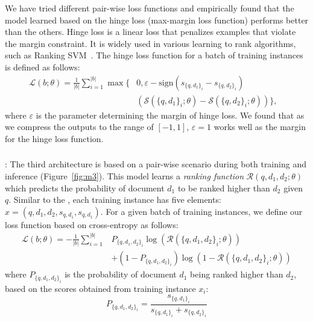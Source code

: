 We have tried different pair-wise loss functions and empirically found that the model learned based on the hinge loss (max-margin loss function) performs better than the others. 
Hinge loss is a linear loss that penalizes examples that violate the margin constraint. It is widely used in various learning to rank algorithms, such as Ranking SVM~\citep{Herbrich:1999}. The hinge loss function for a batch of training instances is defined as follows:
\begin{equation}
\begin{aligned}
\mathcal{L}(b; \theta) = \frac{1}{|b|}
\sum_{i=1}^{|b|}
\max\big\{
& 
0, \varepsilon - \text{sign}
(s_{\{q, d_1\}_i} - s_{\{q, d_2\}_i})
& \\ & 
\left(\mathcal{S}\left(\{q, d_1\}_i; \theta\right) -\mathcal{S}\left(\{q, d_2\}_i; \theta\right)\right)
\big\}
, 
\end{aligned}     
\end{equation}
where $\varepsilon$ is the parameter determining the margin of hinge loss. We found that as we compress the outputs to the range of $[-1, 1]$, $\varepsilon=1$ works well as the margin for the hinge loss function.

\subsubsection{\label{sec:modelthree}\Modelthree}:
The third architecture is based on a pair-wise scenario during both training and inference (Figure~\ref{fig:m3}). This model learns a \emph{ranking function} $\mathcal{R}(q, d_1, d_2; \theta)$ which predicts the probability of document $d_1$ to be ranked higher than $d_2$ given $q$.
Similar to the \modeltwo, each training instance has five elements: $x = (q,d_1, d_2, s_{q,d_1}, s_{q,d_1})$.
For a given batch of training instances, we define our loss function based on cross-entropy as follows:
\begin{align}
\mathcal{L}(b; \theta) = -\frac{1}{|b|}
\sum_{i=1}^{|b|} &
P_{\{q,d_1,d_2\}_i} \log(\mathcal{R}(\{q,d_1,d_2\}_i; \theta)) \\
&
+ (1- P_{\{q,d_1,d_2\}_i})\log(1- \mathcal{R}(\{q,d_1,d_2\}_i; \theta)) \nonumber
\end{align}
where $P_{\{q,d_1,d_2\}_i}$ is the probability of document $d_1$ being ranked higher than $d_2$, based on the scores obtained from training instance $x_i$:
\begin{equation}
P_{\{q,d_1,d_2\}_i} = \frac{s_{\{q,d_1\}_i}}{s_{\{q,d_1\}_i} + s_{\{q,d_2\}_i}}
\end{equation}

